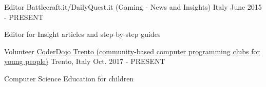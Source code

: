 

\begin{cventries}

  \cventry
    {Editor} %
    {Battlecraft.it/DailyQuest.it (Gaming - News and Insights)} %
    {Italy} %
    {June 2015 - PRESENT} %
    {
      \begin{cvitems} %
        \item {Editor for Insight articles and step-by-step guides}
      \end{cvitems}
    }

  \cventry
    {Volunteer} %
    {\href{https://www.coderdojotrento.it/}{CoderDojo Trento (community-based computer programming clubs for young people)}} %
    {Trento, Italy} %
    {Oct. 2017 - PRESENT} %
    {
      \begin{cvitems} %
        \item {Computer Science Education for children}
      \end{cvitems}
    }


\end{cventries}
